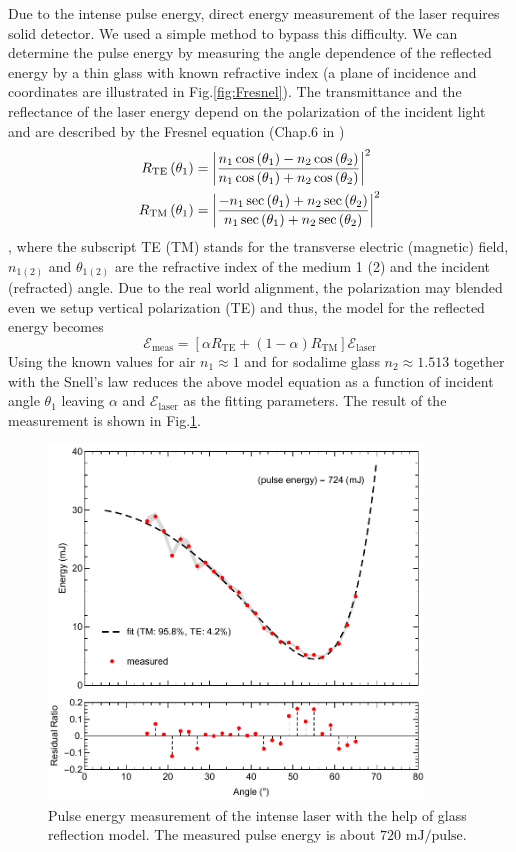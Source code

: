 Due to the intense pulse energy, direct energy measurement of the laser requires solid detector. We used a simple method to bypass this difficulty. We can determine the pulse energy by measuring the angle dependence of the reflected energy by a thin glass with known refractive index (a plane of incidence and coordinates are illustrated in Fig.\ref{fig:Fresnel}). The transmittance and the reflectance of the laser energy depend on the polarization of the incident light and are described by the Fresnel equation (Chap.6 in \cite{saleh2019fundamentals})
\begingroup
\allowdisplaybreaks
\begin{align}
R_\text{TE} \left( \theta_1 \right) &= \abs{ \frac{n_1 \cos \left( \theta_1 \right) - n_2 \cos \left( \theta_2 \right)}{n_1 \cos \left( \theta_1 \right) + n_2 \cos \left( \theta_2 \right)} }^2 \\
R_\text{TM} \left( \theta_1 \right) &= \abs{ \frac{ - n_1 \sec \left( \theta_1 \right) + n_2 \sec \left( \theta_2 \right)}{n_1 \sec \left( \theta_1 \right) + n_2 \sec \left( \theta_2 \right)} }^2
\end{align}
\endgroup
, where the subscript TE (TM) stands for the transverse electric (magnetic) field, $n_{1(2)}$ and $\theta_{1(2)}$ are the refractive index of the medium 1 (2) and the incident (refracted) angle. Due to the real world alignment, the polarization may blended even we setup vertical polarization (TE) and thus, the model for the reflected energy becomes
\begin{equation}
\mathcal{E}_\text{meas} = \left[ \alpha R_\text{TE} + \left( 1-\alpha \right) R_\text{TM} \right] \mathcal{E}_\text{laser}
\end{equation}
Using the known values for air $n_1 \approx 1$ and for sodalime glass $n_2 \approx 1.513$ together with the Snell's law reduces the above model equation as a function of incident angle $\theta_1$ leaving $\alpha$ and $\mathcal{E}_\text{laser}$ as the fitting parameters. The result of the measurement is shown in Fig.\ref{fig:pulseEnergy}.

\begin{figure}[ht!]
\centering
\includegraphics[width=100mm]{figures/ap5/pulse/energy.pdf}
\caption{Pulse energy measurement of the intense laser with the help of glass reflection model. The measured pulse energy is about $720 \text{ mJ/pulse}$.}
\label{fig:pulseEnergy}
\end{figure}


